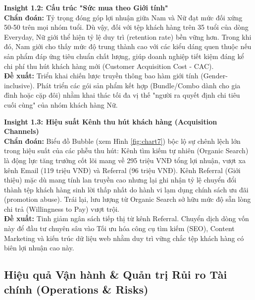 \documentclass{article}
\begin{document}
\textbf{Insight 1.2: Cấu trúc "Sức mua theo Giới tính"} \\
\textbf{Chẩn đoán:} Tỷ trọng đóng góp lợi nhuận giữa Nam và Nữ đạt mức đối xứng 50-50 trên mọi nhóm tuổi. Dù vậy, đối với tệp khách hàng trên 35 tuổi của dòng Everyday, Nữ giới thể hiện tỷ lệ duy trì (retention rate) bền vững hơn. Trong khi đó, Nam giới cho thấy mức độ trung thành cao với các kiểu dáng quen thuộc nếu sản phẩm đáp ứng tiêu chuẩn chất lượng, giúp doanh nghiệp tiết kiệm đáng kể chi phí thu hút khách hàng mới (Customer Acquisition Cost - CAC).
\\
\textbf{Đề xuất:} Triển khai chiến lược truyền thông bao hàm giới tính (Gender-inclusive). Phát triển các gói sản phẩm kết hợp (Bundle/Combo dành cho gia đình hoặc cặp đôi) nhằm khai thác tối đa vị thế "người ra quyết định chi tiêu cuối cùng" của nhóm khách hàng Nữ.

\textbf{Insight 1.3: Hiệu suất Kênh thu hút khách hàng (Acquisition Channels)} \\
\textbf{Chẩn đoán:} Biểu đồ Bubble (xem Hình \ref{fig:chart7}) bộc lộ sự chênh lệch lớn trong hiệu suất của các phễu thu hút: Kênh tìm kiếm tự nhiên (Organic Search) là động lực tăng trưởng cốt lõi mang về 295 triệu VNĐ tổng lợi nhuận, vượt xa kênh Email (119 triệu VNĐ) và Referral (96 triệu VNĐ). Kênh Referral (Giới thiệu) mặc dù mang tính lan truyền cao nhưng lại ghi nhận tỷ lệ chuyển đổi thành tệp khách hàng sinh lời thấp nhất do hành vi lạm dụng chính sách ưu đãi (promotion abuse). Trái lại, lưu lượng từ Organic Search sở hữu mức độ sẵn lòng chi trả (Willingness to Pay) vượt trội.
\\
\textbf{Đề xuất:} Tinh giảm ngân sách tiếp thị từ kênh Referral. Chuyển dịch dòng vốn này để đầu tư chuyên sâu vào Tối ưu hóa công cụ tìm kiếm (SEO), Content Marketing và kiến trúc dữ liệu web nhằm duy trì vững chắc tệp khách hàng có biên lợi nhuận cao này.

\subsection{Hiệu quả Vận hành \& Quản trị Rủi ro Tài chính (Operations \& Risks)}
\end{document}

